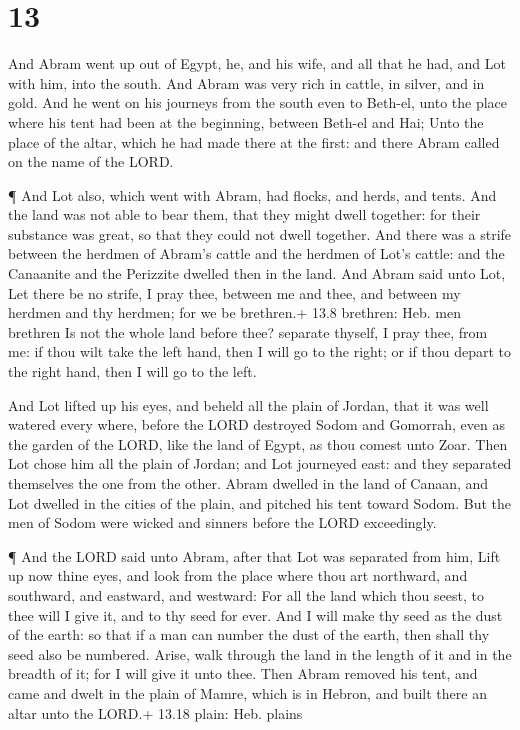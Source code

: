 \hypertarget{section-12}{%
\section{13}\label{section-12}}

 And Abram went up out of Egypt, he, and his wife, and all
that he had, and Lot with him, into the south.  And Abram
was very rich in cattle, in silver, and in gold.  And he
went on his journeys from the south even to Beth-el, unto the place
where his tent had been at the beginning, between Beth-el and Hai;
 Unto the place of the altar, which he had made there at the
first: and there Abram called on the name of the LORD.

 ¶ And Lot also, which went with Abram, had flocks, and
herds, and tents.  And the land was not able to bear them,
that they might dwell together: for their substance was great, so that
they could not dwell together.  And there was a strife
between the herdmen of Abram's cattle and the herdmen of Lot's cattle:
and the Canaanite and the Perizzite dwelled then in the land.
 And Abram said unto Lot, Let there be no strife, I pray
thee, between me and thee, and between my herdmen and thy herdmen; for
we be brethren.+ 13.8 brethren: Heb. men brethren  Is not
the whole land before thee? separate thyself, I pray thee, from me: if
thou wilt take the left hand, then I will go to the right; or if thou
depart to the right hand, then I will go to the left.

 And Lot lifted up his eyes, and beheld all the plain of
Jordan, that it was well watered every where, before the LORD destroyed
Sodom and Gomorrah, even as the garden of the LORD, like the land of
Egypt, as thou comest unto Zoar.  Then Lot chose him all
the plain of Jordan; and Lot journeyed east: and they separated
themselves the one from the other.  Abram dwelled in the
land of Canaan, and Lot dwelled in the cities of the plain, and pitched
his tent toward Sodom.  But the men of Sodom were wicked
and sinners before the LORD exceedingly.

 ¶ And the LORD said unto Abram, after that Lot was
separated from him, Lift up now thine eyes, and look from the place
where thou art northward, and southward, and eastward, and westward:
 For all the land which thou seest, to thee will I give it,
and to thy seed for ever.  And I will make thy seed as the
dust of the earth: so that if a man can number the dust of the earth,
then shall thy seed also be numbered.  Arise, walk through
the land in the length of it and in the breadth of it; for I will give
it unto thee.  Then Abram removed his tent, and came and
dwelt in the plain of Mamre, which is in Hebron, and built there an
altar unto the LORD.+ 13.18 plain: Heb. plains

